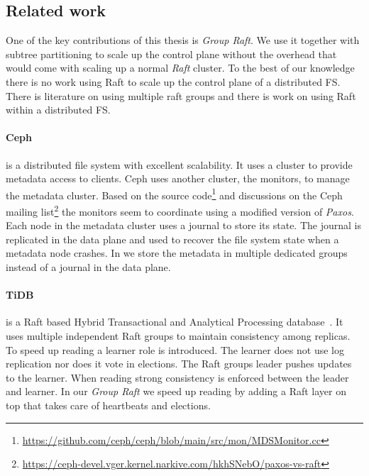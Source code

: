 \subsection{Related work} \label{sec:rel}
One of the key contributions of this thesis is \textit{Group Raft}. We use it together with subtree partitioning to scale up the control plane without the overhead that would come with scaling up a normal \textit{Raft} cluster. To the best of our knowledge there is no work using Raft to scale up the control plane of a distributed FS. There is literature on using multiple raft groups and there is work on using Raft within a distributed FS.
%
\paragraph{Ceph} is a distributed file system with excellent scalability. It uses a cluster to provide metadata access to clients. Ceph uses another cluster, the monitors, to manage the metadata cluster. Based on the source code\footnote{\href{https://github.com/ceph/ceph/blob/main/src/mon/MDSMonitor.cc}{https://github.com/ceph/ceph/blob/main/src/mon/MDSMonitor.cc}} and discussions on the Ceph mailing list\footnote{\href{https://ceph-devel.vger.kernel.narkive.com/hkhSNebO/paxos-vs-raft}{https://ceph-devel.vger.kernel.narkive.com/hkhSNebO/paxos-vs-raft}} the monitors seem to coordinate using a modified version of \textit{Paxos}. Each node in the metadata cluster uses a journal to store its state. The journal is replicated in the data plane and used to recover the file system state when a metadata node crashes. In \name{} we store the metadata in multiple  dedicated groups instead of a journal in the data plane.
%
\paragraph{TiDB} is a Raft based Hybrid Transactional and Analytical Processing database~\cite{tidb}. It uses multiple independent Raft groups to maintain consistency among replicas. To speed up reading a learner role is introduced. The learner does not use log replication nor does it vote in elections. The Raft groups leader pushes updates to the learner. When reading strong consistency is enforced between the leader and learner. In our \textit{Group Raft} we speed up reading by adding a Raft layer on top that takes care of heartbeats and elections.
%
